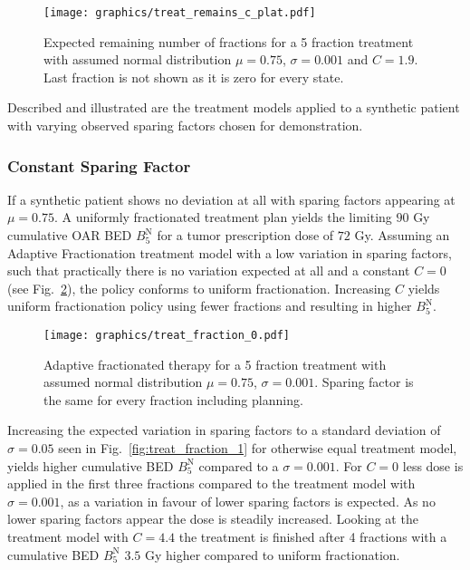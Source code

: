\documentclass[\relativeRoot/ada.tex]{subfiles}
\begin{document}
\begin{figure}[!htb]
    \centering
    \texttt{[image: graphics/treat\_remains\_c\_plat.pdf]}
    \caption{Expected remaining number of fractions for a 5 fraction treatment with assumed normal distribution $\mu=0.75$, $\sigma=0.001$ and $C=1.9$. Last fraction is not shown as it is zero for every state.}
    \label{fig:treat_remains_c_plat}
\end{figure}

Described and illustrated are the treatment models applied to a synthetic patient with varying observed sparing factors chosen for demonstration. 

\subsubsection{Constant Sparing Factor}
If a synthetic patient shows no deviation at all with sparing factors appearing at $\mu = 0.75$. A uniformly fractionated treatment plan yields the limiting $90$ Gy cumulative OAR BED $B_5^{\text{N}}$ for a tumor prescription dose of $72$ Gy. Assuming an Adaptive Fractionation treatment model with a low variation in sparing factors, such that practically there is no variation expected at all and a constant $C=0$ (see Fig.~\ref{fig:treat_fraction_0}), the policy conforms to uniform fractionation. Increasing $C$ yields uniform fractionation policy using fewer fractions and resulting in higher $B_5^{\text{N}}$.
\begin{figure}[!htb]
    \centering
    \texttt{[image: graphics/treat\_fraction\_0.pdf]}
    \caption{Adaptive fractionated therapy for a 5 fraction treatment with assumed normal distribution $\mu=0.75$, $\sigma=0.001$. Sparing factor is the same for every fraction including planning.}
    \label{fig:treat_fraction_0}
\end{figure}

Increasing the expected variation in sparing factors to a standard deviation of $\sigma=0.05$ seen in Fig.~\ref{fig:treat_fraction_1} for otherwise equal treatment model, yields higher cumulative BED $B_5^{\text{N}}$ compared to a $\sigma=0.001$. For $C=0$ less dose is applied in the first three fractions compared to the treatment model with $\sigma=0.001$, as a variation in favour of lower sparing factors is expected. As no lower sparing factors appear the dose is steadily increased. Looking at the treatment model with $C=4.4$ the treatment is finished after 4 fractions with a cumulative BED $B_5^{\text{N}}$ $3.5$ Gy higher compared to uniform fractionation.
\end{document}
